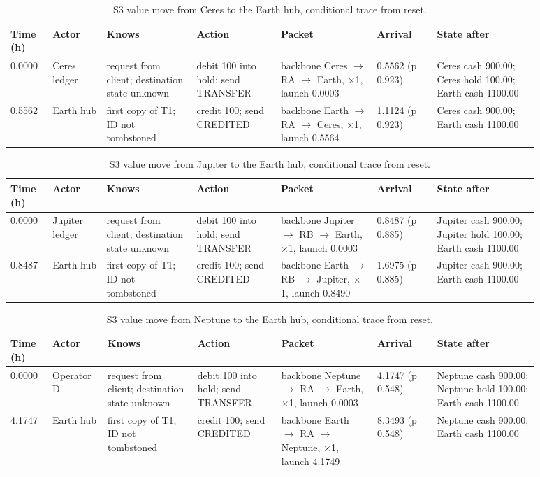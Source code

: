 {\setlength{\tabcolsep}{3pt}\begin{longtable}{@{}p{0.07\linewidth}p{0.09\linewidth}p{0.15\linewidth}p{0.14\linewidth}p{0.16\linewidth}p{0.1\linewidth}p{0.17\linewidth}@{}}
\caption{S3 value move from Ceres to the Earth hub, conditional trace from reset.}\\
\toprule
Time (h) & Actor & Knows & Action & Packet & Arrival & State after \\
\midrule
\endhead
0.0000 & Ceres ledger & request from client; destination state unknown & debit 100 into hold; send TRANSFER & backbone Ceres $\to$ RA $\to$ Earth, $\times$1, launch 0.0003 & 0.5562 (p 0.923) & Ceres cash 900.00; Ceres hold 100.00; Earth cash 1100.00 \\
0.5562 & Earth hub & first copy of T1; ID not tombstoned & credit 100; send CREDITED & backbone Earth $\to$ RA $\to$ Ceres, $\times$1, launch 0.5564 & 1.1124 (p 0.923) & Ceres cash 900.00; Earth cash 1100.00 \\
\bottomrule
\end{longtable}}

{\setlength{\tabcolsep}{3pt}\begin{longtable}{@{}p{0.07\linewidth}p{0.09\linewidth}p{0.15\linewidth}p{0.14\linewidth}p{0.16\linewidth}p{0.1\linewidth}p{0.17\linewidth}@{}}
\caption{S3 value move from Jupiter to the Earth hub, conditional trace from reset.}\\
\toprule
Time (h) & Actor & Knows & Action & Packet & Arrival & State after \\
\midrule
\endhead
0.0000 & Jupiter ledger & request from client; destination state unknown & debit 100 into hold; send TRANSFER & backbone Jupiter $\to$ RB $\to$ Earth, $\times$1, launch 0.0003 & 0.8487 (p 0.885) & Jupiter cash 900.00; Jupiter hold 100.00; Earth cash 1100.00 \\
0.8487 & Earth hub & first copy of T1; ID not tombstoned & credit 100; send CREDITED & backbone Earth $\to$ RB $\to$ Jupiter, $\times$1, launch 0.8490 & 1.6975 (p 0.885) & Jupiter cash 900.00; Earth cash 1100.00 \\
\bottomrule
\end{longtable}}

{\setlength{\tabcolsep}{3pt}\begin{longtable}{@{}p{0.07\linewidth}p{0.09\linewidth}p{0.15\linewidth}p{0.14\linewidth}p{0.16\linewidth}p{0.1\linewidth}p{0.17\linewidth}@{}}
\caption{S3 value move from Neptune to the Earth hub, conditional trace from reset.}\\
\toprule
Time (h) & Actor & Knows & Action & Packet & Arrival & State after \\
\midrule
\endhead
0.0000 & Operator D & request from client; destination state unknown & debit 100 into hold; send TRANSFER & backbone Neptune $\to$ RA $\to$ Earth, $\times$1, launch 0.0003 & 4.1747 (p 0.548) & Neptune cash 900.00; Neptune hold 100.00; Earth cash 1100.00 \\
4.1747 & Earth hub & first copy of T1; ID not tombstoned & credit 100; send CREDITED & backbone Earth $\to$ RA $\to$ Neptune, $\times$1, launch 4.1749 & 8.3493 (p 0.548) & Neptune cash 900.00; Earth cash 1100.00 \\
\bottomrule
\end{longtable}}
